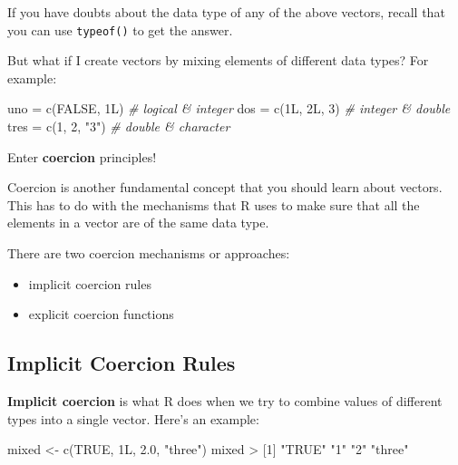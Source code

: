 \documentclass[
]{book}
\newenvironment{Shaded}{\begin{snugshade}}{\end{snugshade}}
\newcommand{\CommentTok}[1]{\textcolor[rgb]{0.56,0.35,0.01}{\textit{#1}}}
\newcommand{\ConstantTok}[1]{\textcolor[rgb]{0.00,0.00,0.00}{#1}}
\newcommand{\DecValTok}[1]{\textcolor[rgb]{0.00,0.00,0.81}{#1}}
\newcommand{\FloatTok}[1]{\textcolor[rgb]{0.00,0.00,0.81}{#1}}
\newcommand{\FunctionTok}[1]{\textcolor[rgb]{0.00,0.00,0.00}{#1}}
\newcommand{\NormalTok}[1]{#1}
\newcommand{\OtherTok}[1]{\textcolor[rgb]{0.56,0.35,0.01}{#1}}
\newcommand{\SpecialCharTok}[1]{\textcolor[rgb]{0.00,0.00,0.00}{#1}}
\newcommand{\StringTok}[1]{\textcolor[rgb]{0.31,0.60,0.02}{#1}}
\begin{document}
If you have doubts about the data type of any of the above vectors, recall
that you can use \texttt{typeof()} to get the answer.

But what if I create vectors by mixing elements of different data types? For
example:

\begin{Shaded}
\begin{Highlighting}[]
\NormalTok{uno }\OtherTok{=} \FunctionTok{c}\NormalTok{(}\ConstantTok{FALSE}\NormalTok{, 1L)    }\CommentTok{\# logical \& integer}
\NormalTok{dos }\OtherTok{=} \FunctionTok{c}\NormalTok{(1L, 2L, }\DecValTok{3}\NormalTok{)    }\CommentTok{\# integer \& double}
\NormalTok{tres }\OtherTok{=} \FunctionTok{c}\NormalTok{(}\DecValTok{1}\NormalTok{, }\DecValTok{2}\NormalTok{, }\StringTok{"3"}\NormalTok{)   }\CommentTok{\# double \& character}
\end{Highlighting}
\end{Shaded}

Enter \textbf{coercion} principles!

Coercion is another fundamental concept that you should learn about vectors.
This has to do with the mechanisms that R uses to make sure that all the
elements in a vector are of the same data type.

There are two coercion mechanisms or approaches:

\begin{itemize}
\item
  implicit coercion rules
\item
  explicit coercion functions
\end{itemize}

\hypertarget{implicit-coercion-rules}{%
\subsection{Implicit Coercion Rules}\label{implicit-coercion-rules}}

\textbf{Implicit coercion} is what R does when we try to combine values of different
types into a single vector. Here's an example:

\begin{Shaded}
\begin{Highlighting}[]
\NormalTok{mixed }\OtherTok{\textless{}{-}} \FunctionTok{c}\NormalTok{(}\ConstantTok{TRUE}\NormalTok{, 1L, }\FloatTok{2.0}\NormalTok{, }\StringTok{"three"}\NormalTok{)}
\NormalTok{mixed}
\SpecialCharTok{\textgreater{}}\NormalTok{ [}\DecValTok{1}\NormalTok{] }\StringTok{"TRUE"}  \StringTok{"1"}     \StringTok{"2"}     \StringTok{"three"}
\end{Highlighting}
\end{Shaded}
\end{document}

